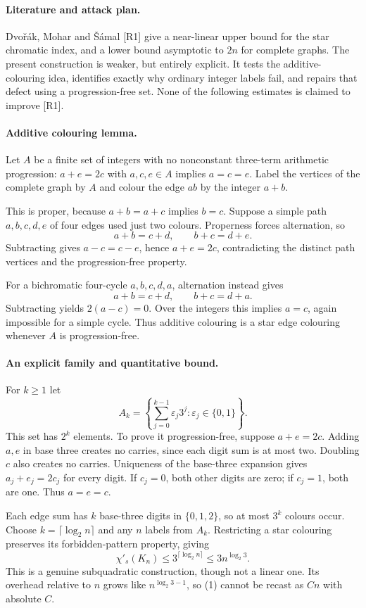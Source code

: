 \documentclass[11pt,a4paper]{article}
\begin{document}
\paragraph{Literature and attack plan.}
Dvořák, Mohar and Šámal [R1] give a near-linear upper bound for the star chromatic index, and a lower bound asymptotic to $2n$ for complete graphs. The present construction is weaker, but entirely explicit. It tests the additive-colouring idea, identifies exactly why ordinary integer labels fail, and repairs that defect using a progression-free set. None of the following estimates is claimed to improve [R1].

\paragraph{Additive colouring lemma.}
Let $A$ be a finite set of integers with no nonconstant three-term arithmetic progression: $a+e=2c$ with $a,c,e\in A$ implies $a=c=e$. Label the vertices of the complete graph by $A$ and colour the edge $ab$ by the integer $a+b$.

This is proper, because $a+b=a+c$ implies $b=c$. Suppose a simple path $a,b,c,d,e$ of four edges used just two colours. Properness forces alternation, so
\[
 a+b=c+d,\qquad b+c=d+e.
\]
Subtracting gives $a-c=c-e$, hence $a+e=2c$, contradicting the distinct path vertices and the progression-free property.

For a bichromatic four-cycle $a,b,c,d,a$, alternation instead gives
\[
 a+b=c+d,\qquad b+c=d+a.
\]
Subtracting yields $2(a-c)=0$. Over the integers this implies $a=c$, again impossible for a simple cycle. Thus additive colouring is a star edge colouring whenever $A$ is progression-free.

\paragraph{An explicit family and quantitative bound.}
For $k\ge1$ let
\[
 A_k=\left\{\sum_{j=0}^{k-1}\varepsilon_j3^j:
                  \varepsilon_j\in\{0,1\}\right\}.
\]
This set has $2^k$ elements. To prove it progression-free, suppose $a+e=2c$. Adding $a,e$ in base three creates no carries, since each digit sum is at most two. Doubling $c$ also creates no carries. Uniqueness of the base-three expansion gives $a_j+e_j=2c_j$ for every digit. If $c_j=0$, both other digits are zero; if $c_j=1$, both are one. Thus $a=e=c$.

Each edge sum has $k$ base-three digits in $\{0,1,2\}$, so at most $3^k$ colours occur. Choose $k=\lceil\log_2 n\rceil$ and any $n$ labels from $A_k$. Restricting a star colouring preserves its forbidden-pattern property, giving
\[
 \chi'_s(K_n)\le3^{\lceil\log_2 n\rceil}
             \le3n^{\log_2 3}. \tag{1}
\]
This is a genuine subquadratic construction, though not a linear one. Its overhead relative to $n$ grows like $n^{\log_2 3-1}$, so (1) cannot be recast as $Cn$ with absolute $C$.
\end{document}
